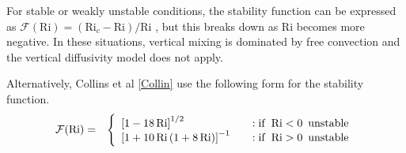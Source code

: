 For stable or weakly unstable conditions, the stability function can be expressed as
$\mathcal{F}(\mathrm{Ri}) = (\mathrm{Ri}_c-\mathrm{Ri})/\mathrm{Ri}$ \cite{Jacobson}, %
but this breaks down as $\mathrm{Ri}$ becomes more negative. In these situations, vertical mixing
is dominated by free convection and the vertical diffusivity model does not apply.

Alternatively, Collins et al \ref{Collin} use the following form for the stability function.
\begin{eqnarray}\label{EqPhiB}
\mathcal{F}(\mathrm{Ri}) &=& \left\{ \begin{array} {l@{\quad \quad}l}
 \left[ 1 -18 \, \mathrm{Ri} \right]^{1/2}                         &: \mathrm{if}\,\,\, \mathrm{Ri} < 0 \,\,\, \mathrm{unstable} \\
 \left[ 1+ 10 \, \mathrm{Ri} \, (1+8 \, \mathrm{Ri}) \right]^{-1}  &: \mathrm{if}\,\,\, \mathrm{Ri} > 0 \,\,\, \mathrm{unstable}
\end{array}
\right.
\end{eqnarray}


